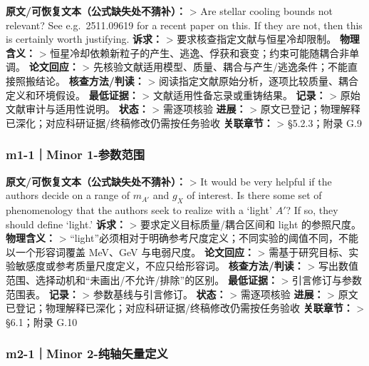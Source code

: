 \documentclass[
]{article}
\begin{document}
\textbf{原文/可恢复文本（公式缺失处不猜补）：} \textgreater{} Are
stellar cooling bounds not relevant? See e.g.~2511.09619 for a recent
paper on this. If they are not, then this is certainly worth justifying.
\textbf{诉求：} \textgreater{} 要求核查指定文献与恒星冷却限制。
\textbf{物理含义：} \textgreater{}
恒星冷却依赖新粒子的产生、逃逸、俘获和衰变；约束可能随耦合非单调。
\textbf{论文回应：} \textgreater{}
先核验文献适用模型、质量、耦合与产生/逃逸条件；不能直接照搬结论。
\textbf{核查方法/判读：} \textgreater{}
阅读指定文献原始分析，逐项比较质量、耦合定义和环境假设。
\textbf{最低证据：} \textgreater{} 文献适用性备忘录或重铸结果。
\textbf{记录：} \textgreater{} 原始文献审计与适用性说明。
\textbf{状态：} \textgreater{} 需逐项核验 \textbf{进展：} \textgreater{}
原文已登记；物理解释已深化；对应科研证据/终稿修改仍需按任务验收
\textbf{关联章节：} \textgreater{} §5.2.3；附录 G.9

\subsubsection{m1-1｜Minor
1-参数范围}\label{m1-1minor-1-ux53c2ux6570ux8303ux56f4}

\textbf{原文/可恢复文本（公式缺失处不猜补）：} \textgreater{} It would
be very helpful if the authors decide on a range of \(m_{A'}\) and
\(g_X\) of interest. Is there some set of phenomenology that the authors
seek to realize with a `light' \(A'\)? If so, they should define
`light.' \textbf{诉求：} \textgreater{} 要求定义目标质量/耦合区间和
light 的参照尺度。 \textbf{物理含义：} \textgreater{}
``light''必须相对于明确参考尺度定义；不同实验的阈值不同，不能以一个形容词覆盖
MeV、GeV 与电弱尺度。 \textbf{论文回应：} \textgreater{}
需基于研究目标、实验敏感度或参考质量尺度定义，不应只给形容词。
\textbf{核查方法/判读：} \textgreater{}
写出数值范围、选择动机和``未画出/不允许/排除''的区别。
\textbf{最低证据：} \textgreater{} 引言修订与参数范围表。
\textbf{记录：} \textgreater{} 参数基线与引言修订。 \textbf{状态：}
\textgreater{} 需逐项核验 \textbf{进展：} \textgreater{}
原文已登记；物理解释已深化；对应科研证据/终稿修改仍需按任务验收
\textbf{关联章节：} \textgreater{} §6.1；附录 G.10

\subsubsection{m2-1｜Minor
2-纯轴矢量定义}\label{m2-1minor-2-ux7eafux8f74ux77e2ux91cfux5b9aux4e49}
\end{document}
